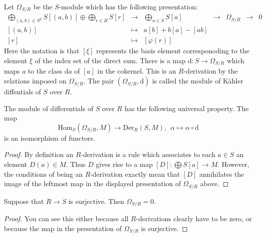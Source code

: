 \medskip\noindent
Let $\Omega_{S/R}$ be the $S$-module which has the
following presentation:
$$
\begin{matrix}
\bigoplus_{(a, b)\in S^2} S[(a, b)] \oplus \bigoplus_{r\in R} S[r]
&
\to
&
\bigoplus_{a\in S} S [a]
&
\to
&
\Omega_{S/R}
&
\to
&
0
\\
[(a, b)]
&
\mapsto
&
a[b] + b[a] - [ab]
&
&
&
&
\\
[r]
&
\mapsto
&
[\varphi(r)]
&
&
&
&
\end{matrix}
$$
Here the notation is that $[\xi]$ represents the basis
element corresponoding to the element $\xi$ of the index set
of the direct sum. There is a map $\text{d} : S \to \Omega_{S/R}$
which maps $a$ to the class $\text{d}a$ of $[a]$ in the cokernel.
This is an $R$-derivation by the relations imposed on $\Omega_{S/R}$.
The pair $(\Omega_{S/R}, \text{d})$ is called the module
of K\"ahler diffentials of $S$ over $R$.

\begin{lemma}
\label{lemma-universal-omega}
The module of differentials of $S$ over $R$ has the following
universal property. The map
$$
\text{Hom}_S(\Omega_{S/R}, M)
\longrightarrow
\text{Der}_R(S, M), \ \ 
\alpha
\longmapsto
\alpha \circ \text{d}
$$
is an isomorphism of functors.
\end{lemma}

\begin{proof}
By definition an $R$-derivation is a rule which associates
to each $a \in S$ an element $D(a) \in M$. Thus $D$ gives
rise to a map $[D] : \bigoplus S[a] \to M$. However, the conditions
of being an $R$-derivation exactly mean that $[D]$ annihilates
the image of the leftmost map in the displayed presentation of
$\Omega_{S/R}$ above.
\end{proof}

\begin{lemma}
\label{lemma-trivial-differential-surjective}
Suppose that $R \to S$ is surjective.
Then $\Omega_{S/R} = 0$.
\end{lemma}

\begin{proof}
You can see this either because all $R$-derivations
clearly have to be zero, or because
the map in the presentation of $\Omega_{S/R}$ is surjective.
\end{proof}

